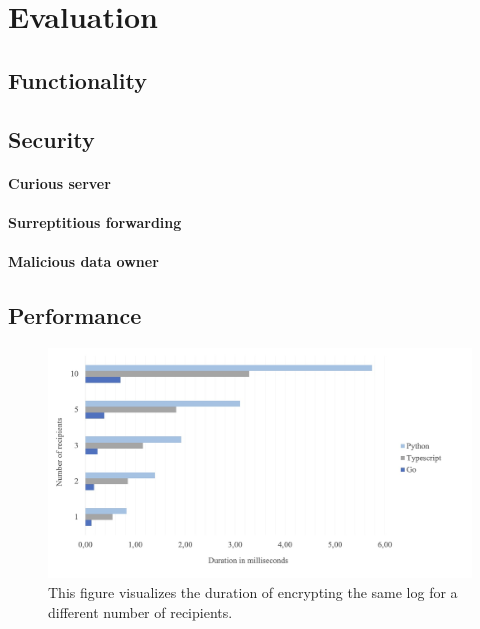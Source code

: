 \documentclass[../main.tex]{subfiles}
\begin{document}
\chapter{Evaluation}

\section{Functionality}

\section{Security}
\subsubsection{Curious server}
\subsubsection{Surreptitious forwarding}
\subsubsection{Malicious data owner}

\section{Performance}

\begin{figure}[ht]
    \includegraphics[scale=0.3]{../img/07/performance_tests.jpg}
    \centering
    \caption{This figure visualizes the duration of encrypting the same log for a different number of recipients.}
    \label{fig:mutual_encryption}
\end{figure}
\end{document}
